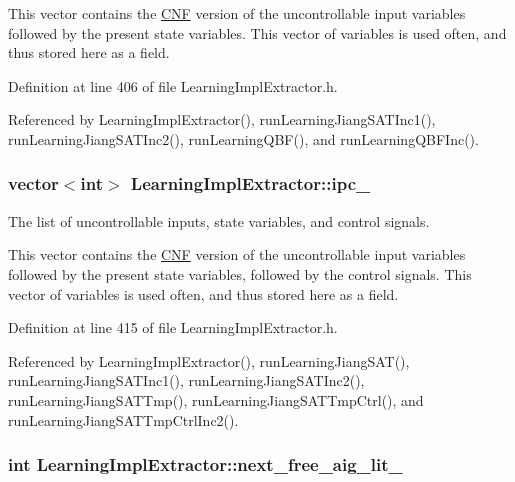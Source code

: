 This vector contains the \hyperlink{classCNF}{C\-N\-F} version of the uncontrollable input variables followed by the present state variables. This vector of variables is used often, and thus stored here as a field. 

Definition at line 406 of file Learning\-Impl\-Extractor.\-h.



Referenced by Learning\-Impl\-Extractor(), run\-Learning\-Jiang\-S\-A\-T\-Inc1(), run\-Learning\-Jiang\-S\-A\-T\-Inc2(), run\-Learning\-Q\-B\-F(), and run\-Learning\-Q\-B\-F\-Inc().

\hypertarget{classLearningImplExtractor_ab94459731d569bdd6bb0f3895fb9c184}{
\subsubsection[{ipc\-\_\-}]{\setlength{\rightskip}{0pt plus 5cm}vector$<$int$>$ Learning\-Impl\-Extractor\-::ipc\-\_\-\hspace{0.3cm}{\ttfamily [protected]}}}\label{classLearningImplExtractor_ab94459731d569bdd6bb0f3895fb9c184}


The list of uncontrollable inputs, state variables, and control signals. 

This vector contains the \hyperlink{classCNF}{C\-N\-F} version of the uncontrollable input variables followed by the present state variables, followed by the control signals. This vector of variables is used often, and thus stored here as a field. 

Definition at line 415 of file Learning\-Impl\-Extractor.\-h.



Referenced by Learning\-Impl\-Extractor(), run\-Learning\-Jiang\-S\-A\-T(), run\-Learning\-Jiang\-S\-A\-T\-Inc1(), run\-Learning\-Jiang\-S\-A\-T\-Inc2(), run\-Learning\-Jiang\-S\-A\-T\-Tmp(), run\-Learning\-Jiang\-S\-A\-T\-Tmp\-Ctrl(), and run\-Learning\-Jiang\-S\-A\-T\-Tmp\-Ctrl\-Inc2().

\hypertarget{classLearningImplExtractor_a987219dd3114957f2bd0d9df77a9d7fc}{
\subsubsection[{next\-\_\-free\-\_\-aig\-\_\-lit\-\_\-}]{\setlength{\rightskip}{0pt plus 5cm}int Learning\-Impl\-Extractor\-::next\-\_\-free\-\_\-aig\-\_\-lit\-\_\-\hspace{0.3cm}{\ttfamily [protected]}}}\label{classLearningImplExtractor_a987219dd3114957f2bd0d9df77a9d7fc}


